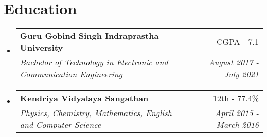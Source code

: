 \documentclass[letterpaper,11pt]{article}
\makeatletter
\newcommand{\resumeSubheading}[4]{
  \vspace{-2pt}\item
    \begin{tabular*}{0.97\textwidth}[t]{l@{\extracolsep{\fill}}r}
      \textbf{#1} & #2 \\
      \textit{\small#3} & \textit{\small #4} \\
    \end{tabular*}\vspace{-7pt}
}
\newcommand{\resumeSubHeadingListStart}{\begin{itemize}[leftmargin=0.15in, label={}]}
\newcommand{\resumeSubHeadingListEnd}{\end{itemize}}
\makeatother
\begin{document}
\section{Education}
  \resumeSubHeadingListStart
    \resumeSubheading
      {Guru Gobind Singh Indraprastha University}{CGPA - 7.1}
      {Bachelor of Technology in Electronic and Communication Engineering}{August 2017 - July 2021}
    \resumeSubheading
      {Kendriya Vidyalaya Sangathan}{12th - 77.4\%}
      {Physics, Chemistry, Mathematics, English and Computer Science}{April 2015 - March 2016}
  \resumeSubHeadingListEnd
\end{document}
